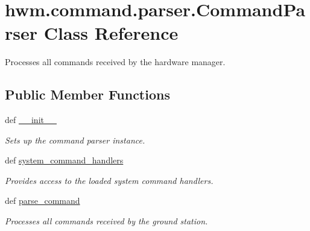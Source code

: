 \hypertarget{classhwm_1_1command_1_1parser_1_1_command_parser}{\section{hwm.\-command.\-parser.\-Command\-Parser Class Reference}
\label{classhwm_1_1command_1_1parser_1_1_command_parser}
}


Processes all commands received by the hardware manager.  


\subsection*{Public Member Functions}
\begin{DoxyCompactItemize}
\item 
def \hyperlink{classhwm_1_1command_1_1parser_1_1_command_parser_a397d835d19f30cbc0af81e4727c242ac}{\-\_\-\-\_\-init\-\_\-\-\_\-}
\begin{DoxyCompactList}\small\item\em Sets up the command parser instance. \end{DoxyCompactList}\item 
def \hyperlink{classhwm_1_1command_1_1parser_1_1_command_parser_a82b1c3fed48de051083d7d56c1dc1d45}{system\-\_\-command\-\_\-handlers}
\begin{DoxyCompactList}\small\item\em Provides access to the loaded system command handlers. \end{DoxyCompactList}\item 
def \hyperlink{classhwm_1_1command_1_1parser_1_1_command_parser_abba503c449762e5c3896b609dad0c575}{parse\-\_\-command}
\begin{DoxyCompactList}\small\item\em Processes all commands received by the ground station. \end{DoxyCompactList}\end{DoxyCompactItemize}
